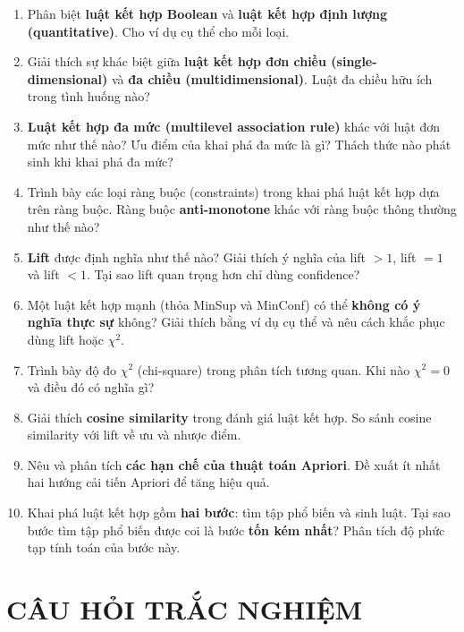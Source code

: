 \documentclass[10pt]{article}
\begin{document}
\begin{enumerate}[leftmargin=*, label=\textbf{Câu \arabic*.}]
    \item Phân biệt \textbf{luật kết hợp Boolean} và \textbf{luật kết hợp định lượng (quantitative)}. Cho ví dụ cụ thể cho mỗi loại.

    \item Giải thích sự khác biệt giữa \textbf{luật kết hợp đơn chiều (single-dimensional)} và \textbf{đa chiều (multidimensional)}. Luật đa chiều hữu ích trong tình huống nào?

    \item \textbf{Luật kết hợp đa mức (multilevel association rule)} khác với luật đơn mức như thế nào? Ưu điểm của khai phá đa mức là gì? Thách thức nào phát sinh khi khai phá đa mức?

    \item Trình bày các loại ràng buộc (constraints) trong khai phá luật kết hợp dựa trên ràng buộc. Ràng buộc \textbf{anti-monotone} khác với ràng buộc thông thường như thế nào?

    \item \textbf{Lift} được định nghĩa như thế nào? Giải thích ý nghĩa của lift $> 1$, lift $= 1$ và lift $< 1$. Tại sao lift quan trọng hơn chỉ dùng confidence?

    \item Một luật kết hợp mạnh (thỏa MinSup và MinConf) có thể \textbf{không có ý nghĩa thực sự} không? Giải thích bằng ví dụ cụ thể và nêu cách khắc phục dùng lift hoặc $\chi^2$.

    \item Trình bày độ đo $\chi^2$ (chi-square) trong phân tích tương quan. Khi nào $\chi^2 = 0$ và điều đó có nghĩa gì?

    \item Giải thích \textbf{cosine similarity} trong đánh giá luật kết hợp. So sánh cosine similarity với lift về ưu và nhược điểm.

    \item Nêu và phân tích \textbf{các hạn chế của thuật toán Apriori}. Đề xuất ít nhất hai hướng cải tiến Apriori để tăng hiệu quả.

    \item Khai phá luật kết hợp gồm \textbf{hai bước}: tìm tập phổ biến và sinh luật. Tại sao bước tìm tập phổ biến được coi là bước \textbf{tốn kém nhất}? Phân tích độ phức tạp tính toán của bước này.

\end{enumerate}

\newpage
\section{CÂU HỎI TRẮC NGHIỆM}
\end{document}
